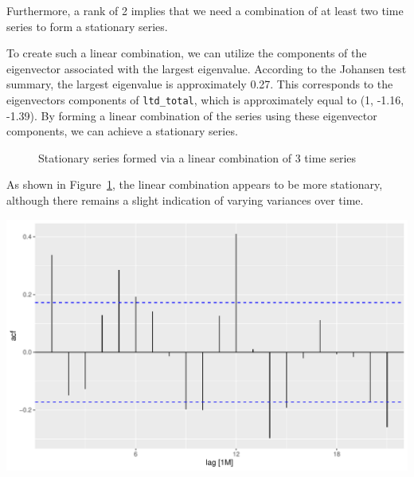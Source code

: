 \documentclass[
  11pt,
  a4paper,
]{article}
\begin{document}
Furthermore, a rank of 2 implies that we need a combination of at least
two time series to form a stationary series.

To create such a linear combination, we can utilize the components of
the eigenvector associated with the largest eigenvalue. According to the
Johansen test summary, the largest eigenvalue is approximately 0.27.
This corresponds to the eigenvectors components of \texttt{ltd\_total},
which is approximately equal to (1, -1.16, -1.39). By forming a linear
combination of the series using these eigenvector components, we can
achieve a stationary series.

\begin{figure}


\caption{\label{fig-splot}Stationary series formed via a linear
combination of 3 time series}

\end{figure}%

As shown in Figure~\ref{fig-splot}, the linear combination appears to be
more stationary, although there remains a slight indication of varying
variances over time.

\includegraphics{Report_files/figure-pdf/unnamed-chunk-30-1.pdf}
\end{document}
